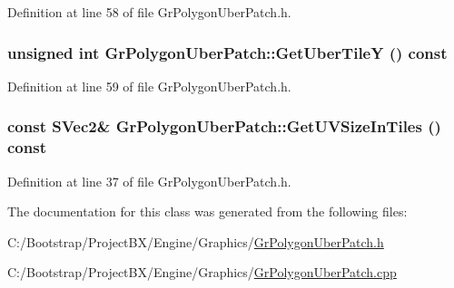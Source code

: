 Definition at line 58 of file GrPolygonUberPatch.h.\hypertarget{class_gr_polygon_uber_patch_7ec4418397af8fc4e5cb3300dd06a1d0}{
\subsubsection[{GetUberTileY}]{\setlength{\rightskip}{0pt plus 5cm}unsigned int GrPolygonUberPatch::GetUberTileY () const}}
\label{class_gr_polygon_uber_patch_7ec4418397af8fc4e5cb3300dd06a1d0}




Definition at line 59 of file GrPolygonUberPatch.h.\hypertarget{class_gr_polygon_uber_patch_0ee8cbafeeb0689c62e1789d6c016574}{
\subsubsection[{GetUVSizeInTiles}]{\setlength{\rightskip}{0pt plus 5cm}const {\bf SVec2}\& GrPolygonUberPatch::GetUVSizeInTiles () const}}
\label{class_gr_polygon_uber_patch_0ee8cbafeeb0689c62e1789d6c016574}




Definition at line 37 of file GrPolygonUberPatch.h.

The documentation for this class was generated from the following files:\begin{CompactItemize}
\item 
C:/Bootstrap/ProjectBX/Engine/Graphics/\hyperlink{_gr_polygon_uber_patch_8h}{GrPolygonUberPatch.h}\item 
C:/Bootstrap/ProjectBX/Engine/Graphics/\hyperlink{_gr_polygon_uber_patch_8cpp}{GrPolygonUberPatch.cpp}\end{CompactItemize}
